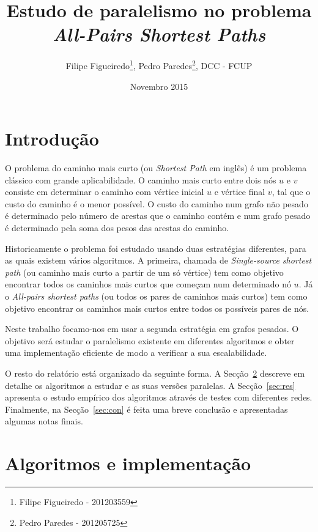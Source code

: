 \documentclass[12pt,a4paper,oneside]{article}
\title{Estudo de paralelismo no problema \textit{All-Pairs Shortest
    Paths}}
\author{Filipe Figueiredo\footnote{Filipe Figueiredo - 201203559},
  Pedro Paredes\footnote{Pedro Paredes - 201205725}, DCC - FCUP}
\date{Novembro 2015}
\begin{document}
\maketitle


\section{Introdução}
\label{sec:intro}
O problema do caminho mais curto (ou \textit{Shortest Path} em inglês)
é um problema clássico com grande aplicabilidade. O caminho mais curto
entre dois nós $u$ e $v$ consiste em determinar o caminho com vértice
inicial $u$ e vértice final $v$, tal que o custo do caminho é o menor
possível. O custo do caminho num grafo não pesado é determinado pelo
número de arestas que o caminho contém e num grafo pesado é
determinado pela soma dos pesos das arestas do caminho.

Historicamente o problema foi estudado usando duas estratégias
diferentes, para as quais existem vários algoritmos. A primeira,
chamada de \textit{Single-source shortest path} (ou caminho mais curto
a partir de um só vértice) tem como objetivo encontrar todos os
caminhos mais curtos que começam num determinado nó $u$. Já o
\textit{All-pairs shortest paths} (ou todos os pares de caminhos mais
curtos) tem como objetivo encontrar os caminhos mais curtos entre
todos os possíveis pares de nós.

Neste trabalho focamo-nos em usar a segunda estratégia em grafos
pesados. O objetivo será estudar o paralelismo existente em diferentes
algoritmos e obter uma implementação eficiente de modo a verificar a
sua escalabilidade.

O resto do relatório está organizado da seguinte forma. A
Secção~\ref{sec:ai} descreve em detalhe os algoritmos a estudar e as
suas versões paralelas. A Secção~\ref{sec:res} apresenta o estudo
empírico dos algoritmos através de testes com diferentes
redes. Finalmente, na Secção~\ref{sec:con} é feita uma breve conclusão
e apresentadas algumas notas finais.



\section{Algoritmos e implementação}
\label{sec:ai}
\end{document}
